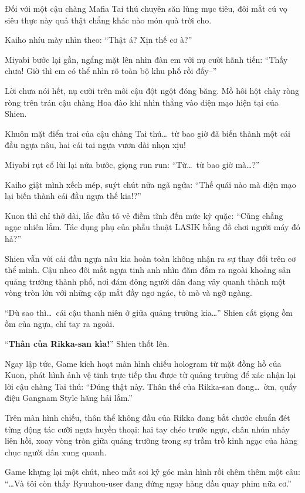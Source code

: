 \documentclass[../main.tex]{subfiles}
\begin{document}
Đối với một cậu chàng Mafia Tai thú chuyên săn lùng mục tiêu, đôi mắt cú vọ siêu thực này quả thật chẳng khác nào món quà trời cho.

Kaiho nhíu mày nhìn theo: ``Thật á? Xịn thế cơ à?''

Miyabi bước lại gần, ngẩng mặt lên nhìn đàn em với nụ cười hãnh tiến: ``Thấy chưa! Giờ thì em có thể nhìn rõ toàn bộ khu phố rồi đấy--''

Lời chưa nói hết, nụ cười trên môi cậu đột ngột đóng băng. Mồ hôi hột chảy ròng ròng trên trán cậu chàng Hoa đào khi nhìn thẳng vào diện mạo hiện tại của Shien.

Khuôn mặt điển trai của cậu chàng Tai thú\dots\ từ bao giờ đã biến thành một cái đầu ngựa nâu, hai cái tai ngựa vươn dài nhọn xịu!


Miyabi rụt cổ lùi lại nửa bước, giọng run run: ``Từ\dots\ từ bao giờ mà\dots?''

Kaiho giật mình xếch mép, suýt chút nữa ngã ngửa: ``Thế quái nào mà diện mạo lại biến thành cái đầu ngựa thế kia!?''

Kuon thì chỉ thở dài, lắc đầu tỏ vẻ điềm tĩnh đến mức kỳ quặc: ``Cũng chẳng ngạc nhiên lắm. Tác dụng phụ của phẫu thuật LASIK bằng đồ chơi người máy đó hả?''

Shien vẫn với cái đầu ngựa nâu kia hoàn toàn không nhận ra sự thay đổi trên cơ thể mình. Cậu nheo đôi mắt ngựa tinh anh nhìn đăm đắm ra ngoài khoảng sân quảng trường thành phố, nơi đám đông người dân đang vây quanh thành một vòng tròn lớn với những cặp mắt đầy ngơ ngác, tò mò và ngỡ ngàng.

``Dù sao thì\dots\ cái cậu thanh niên ở giữa quảng trường kia\dots'' Shien cất giọng ồm ồm của ngựa, chỉ tay ra ngoài.

``\textbf{Thân của Rikka-san kìa!}'' Shien thốt lên.

Ngay lập tức, Game kích hoạt màn hình chiếu hologram từ mặt đồng hồ của Kuon, phát hình ảnh vệ tinh trực tiếp thu được từ quảng trường để xác nhận lại lời cậu chàng Tai thú: ``Đúng thật này. Thân thể của Rikka-san đang\dots\ ờm, quẩy điệu Gangnam Style hăng hái lắm.''

Trên màn hình chiếu, thân thể không đầu của Rikka đang bắt chước chuẩn đét từng động tác cưỡi ngựa huyền thoại: hai tay chéo trước ngực, chân nhún nhảy liên hồi, xoay vòng tròn giữa quảng trường trong sự trầm trồ kinh ngạc của hàng chục người dân xung quanh.


Game khựng lại một chút, nheo mắt soi kỹ góc màn hình rồi chêm thêm một câu: ``\dots Và tôi còn thấy Ryuuhou-user đang đứng ngay hàng đầu quay phim nữa cơ.''
\end{document}
